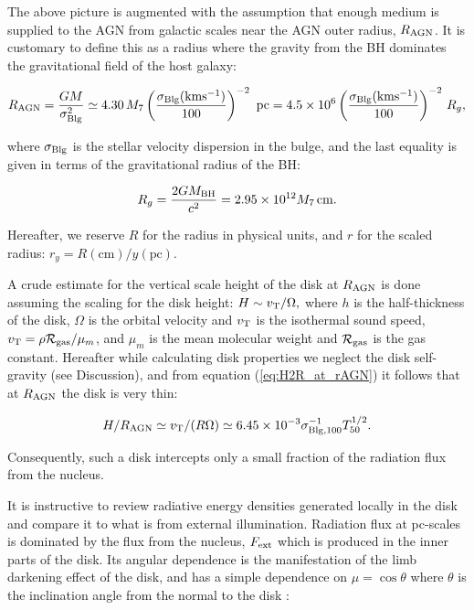 \documentclass[12pt,english,preprint]{aastex}
\newcommand{\su}[2]{#1_{\rm #2}}
\begin{document}
The above picture is augmented with the  assumption that enough medium
is supplied to the AGN from galactic scales near the AGN outer
radius, $R_{{\rm AGN}}$. It is customary to define this as a radius
where the gravity from the BH dominates the gravitational field
of the host galaxy: 


\begin{equation}
R_{{\rm AGN}}=\frac{GM}{\sigma_{{\rm Blg}}^{2}}\simeq4.30\,M_{7}\left(\frac{\sigma_{{\rm Blg}}{\rm (km}{\rm s^{-1}})}{100}\right)^{-2}\text{ pc}=4.5\times10^{6}
\left(\frac{\sigma_{{\rm Blg}}{\rm (km}{\rm s^{-1}})}{100}\right)^{-2}\,{R_{g}},\label{eq:rAGN}
\end{equation}

\noindent where $\sigma_{{\rm Blg}}$ is the stellar velocity dispersion in
the bulge, and the last equality is given in terms of the gravitational
radius of the BH: 

\begin{equation}
R_{g}=\frac{2GM_{{\rm BH}}}{c^{2}}=2.95\times10^{12}M_{7}\,{\rm cm.}\label{eq:RadSchwarz}
\end{equation}

\noindent Hereafter, we reserve $R$ for the radius in physical units, and 
$r$ for the scaled radius: $r_y=R(\text{cm})/y(\text{pc})$.

A crude estimate for the vertical scale height of the disk at $R_{{\rm AGN}}$
is done assuming the scaling for the disk height: $H\sim v_{{\rm T}}/\Omega,$
where $h$ is the half-thickness of the disk, $\Omega$ is the orbital
velocity and $v_{{\rm T}}$ is the isothermal sound speed, $v_{{\rm T}}=\rho\su{{\cal R}}{gas}/\mu_m$,
and $\mu_m$ is the mean molecular weight and $\su{{\cal R}}{gas}$ is the gas
constant. Hereafter while calculating disk properties
we neglect the disk self-gravity (see Discussion), and 
from equation (\ref{eq:H2R_at_rAGN}) it follows that at $\su{R}{AGN}$ 
the disk is very thin:

\begin{equation}
H/R_{\text{AGN}}\simeq v_{{\rm T}}/(R\Omega)\simeq6.45\times10^{-3}\sigma_{{\rm Blg,}100}^{-1}T_{50}^{1/2}.\label{eq:H2R_at_rAGN}
\end{equation}
 
 \noindent Consequently, such a disk intercepts only a small fraction
of the radiation flux from the nucleus. 

It is instructive to review
radiative energy densities generated locally in the disk and compare
it to what is from external illumination. 
Radiation flux at pc-scales is dominated by the flux from the nucleus, $\su{F}{ext}$
which is produced in the 
inner parts of the disk. Its
angular dependence is the manifestation of the limb darkening effect of the disk, and has a simple
dependence on $\mu=\cos\theta$ where $\theta$ is 
the inclination angle from the normal to the disk
\citep[i.e.][]{sobolevCourseTheoreticalAstrophysics1975, 
sunyaevComptonizationLowfrequencyRadiation1985}:
\end{document}
